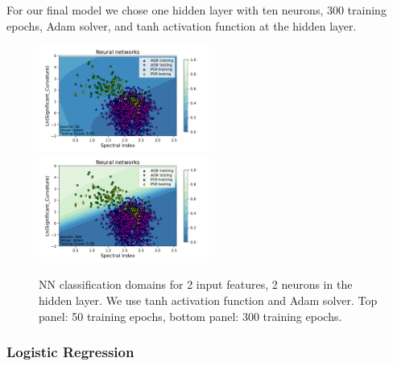 For our final model we chose one hidden layer with ten neurons, 300 training epochs, Adam solver, and tanh activation function at the hidden layer.


\begin{figure}[h]
\center
\includegraphics[width=0.5\textwidth]{plots/classification_domains/nn_adam_10_tanh_50_final.pdf}\\
\includegraphics[width=0.5\textwidth]{plots/classification_domains/nn_adam_10_tanh_300_final.pdf}
\caption{NN classification domains for 2 input features, 2 neurons in the hidden layer. 
We use tanh activation function and Adam solver. Top panel: 50 training epochs, bottom panel: 300 training epochs.}
\label{fig:NN_domains}
\end{figure}

\subsubsection{Logistic Regression}

